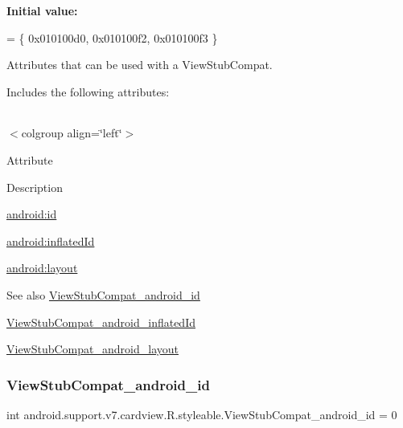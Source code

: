 {\bfseries Initial value\+:}
\begin{DoxyCode}
= \{
            0x010100d0, 0x010100f2, 0x010100f3
        \}
\end{DoxyCode}
Attributes that can be used with a View\+Stub\+Compat. 

Includes the following attributes\+:

\tabulinesep=1mm
\begin{longtabu} spread 0pt [c]{*{0}{|X[-1]}|}
\hline
\end{longtabu}
$<$colgroup align=\char`\"{}left\char`\"{}$>$ 

Attribute

Description 

{\ttfamily \hyperlink{classandroid_1_1support_1_1v7_1_1cardview_1_1R_1_1styleable_a9135acff115a1e0970d5d0c6d23437f8}{android\+:id}}

{\ttfamily \hyperlink{classandroid_1_1support_1_1v7_1_1cardview_1_1R_1_1styleable_ac4cf4cb0039849e872a908401c61ea4f}{android\+:inflated\+Id}}

{\ttfamily \hyperlink{classandroid_1_1support_1_1v7_1_1cardview_1_1R_1_1styleable_a8858b7484f9db791e71043e41d83a4c0}{android\+:layout}}

\begin{DoxySeeAlso}{See also}
\hyperlink{classandroid_1_1support_1_1v7_1_1cardview_1_1R_1_1styleable_a9135acff115a1e0970d5d0c6d23437f8}{View\+Stub\+Compat\+\_\+android\+\_\+id} 

\hyperlink{classandroid_1_1support_1_1v7_1_1cardview_1_1R_1_1styleable_ac4cf4cb0039849e872a908401c61ea4f}{View\+Stub\+Compat\+\_\+android\+\_\+inflated\+Id} 

\hyperlink{classandroid_1_1support_1_1v7_1_1cardview_1_1R_1_1styleable_a8858b7484f9db791e71043e41d83a4c0}{View\+Stub\+Compat\+\_\+android\+\_\+layout} 
\end{DoxySeeAlso}
\mbox{\label{classandroid_1_1support_1_1v7_1_1cardview_1_1R_1_1styleable_a9135acff115a1e0970d5d0c6d23437f8}} 
\subsubsection{\texorpdfstring{View\+Stub\+Compat\+\_\+android\+\_\+id}{ViewStubCompat\_android\_id}}
{\footnotesize\ttfamily int android.\+support.\+v7.\+cardview.\+R.\+styleable.\+View\+Stub\+Compat\+\_\+android\+\_\+id = 0\hspace{0.3cm}{\ttfamily [static]}}

